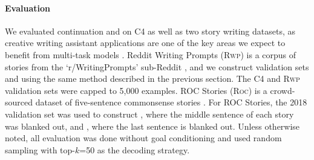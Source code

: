 \paragraph{Evaluation}
We evaluated continuation and \FitB{} on C4 as well as two story writing datasets, as creative writing assistant applications are one of the key areas we expect to benefit from multi-task models \citep{wordcraft}.
Reddit Writing Prompts (\textsc{Rwp}) is a corpus of stories from the `r/WritingPrompts' sub-Reddit \citep{fan2018hierarchical}, and we construct validation sets \rwpFITB{} and \rwpFITE{} using the same method described in the previous section.
The C4 and \textsc{Rwp} validation sets were capped to 5,000 examples.
ROC Stories (\textsc{Roc}) is a crowd-sourced dataset of five-sentence commonsense stories \citep{mostafazadeh2016corpus}.
For ROC Stories, the 2018 validation set was used to construct \rocFITB, where the middle sentence of each story was blanked out, and \rocFITE, where the last sentence is blanked out.
Unless otherwise noted, all evaluation was done without goal conditioning and used random sampling with top-$k$=50 as the decoding strategy.


